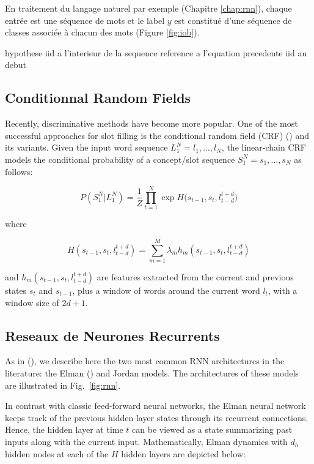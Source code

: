 En traitement du langage naturel par exemple (Chapitre \ref{chap:rnn}), chaque
entrée est une séquence de mots et le label $y$ est constitué d'une séquence
de classes associée à chacun des mots (Figure \ref{fig:iob}).

hypothese iid a l'interieur de la sequence
reference a l'equation precedente iid au debut

\subsection{Conditionnal Random Fields}


Recently, discriminative methods have become more popular. One of the most
successful approaches for slot filling is the conditional random field (CRF)
(\cite{rnn6}) and its variants. Given the input word sequence $L_1^N=l_1,\dots,l_N$, the
linear-chain CRF models the conditional probability of a concept/slot sequence
$S_1^N=s_1,\dots,s_N$ as follows:

\begin{equation}
P(S_{1}^{N}\vert L_{1}^{N}) = \frac{1}{Z}\prod_{t=1}^{N}\exp{H(s_{t-1}, s_{t}, l_{t-d}^{t+d}})
\label{eq:crf1}
\end{equation}

where

\begin{equation}
H(s_{t-1}, s_{t}, l_{t-d}^{t+d}) = \sum_{m=1}^{M}\lambda_{m}h_{m}(s_{t-1}, s_{t}, l_{t-d}^{t+d})
\label{eq:crf2}
\end{equation}

and $h_m (s_{t-1},s_t,l_{t-d}^{t+d})$ are features extracted from the current and
previous states $s_t$ and $s_{t-1}$, plus a window of words around the current word
$l_t$, with a window size of $2d+1$.

\subsection{Reseaux de Neurones Recurrents}

As in (\cite{rnn15}), we describe here the two most common RNN architectures in the
literature: the Elman (\cite{rnn16}) and Jordan \citep{rnn17} models. The architectures of these
models are illustrated in Fig.~\ref{fig:rnn}.

In contrast with classic feed-forward neural networks, the Elman neural network
keeps track of the previous hidden layer states through its recurrent
connections. Hence, the hidden layer at time $t$ can be viewed as a state
summarizing past inputs along with the current input. Mathematically, Elman
dynamics with $d_h$ hidden nodes at each of the $H$ hidden layers are depicted
below:

